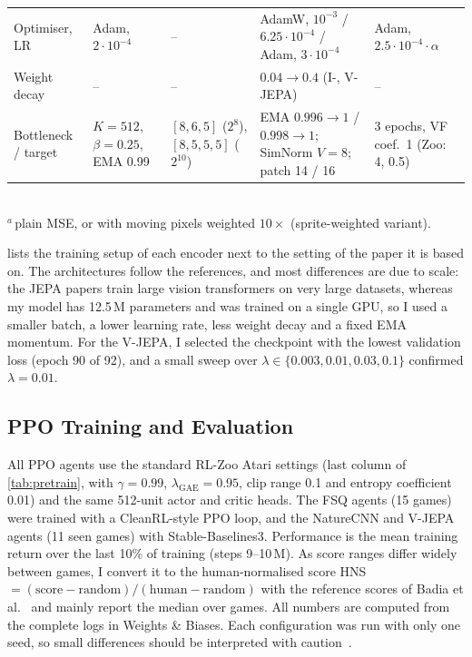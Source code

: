 \documentclass[runningheads]{llncs}
\begin{document}
\begin{table}[t]
\begin{tabular}{@{}Y{1.6cm}Y{2.25cm}Y{2.2cm}Y{2.95cm}Y{2.25cm}@{}}
Optimiser, LR & Adam, $2{\cdot}10^{-4}$ & -- & AdamW, $10^{-3}$ / $6.25{\cdot}10^{-4}$ / Adam, $3{\cdot}10^{-4}$ &
  Adam, $2.5{\cdot}10^{-4}\cdot\alpha$ \\
Weight decay & -- & -- & $0.04\to0.4$ (I-, V-JEPA) & -- \\
Bottleneck / target & $K{=}512$, $\beta{=}0.25$, EMA 0.99 & $[8,6,5]$ ($2^8$), $[8,5,5,5]$ ($2^{10}$) &
  EMA $0.996\to1$ / $0.998\to1$; SimNorm $V{=}8$; patch 14 / 16 & 3 epochs, VF coef.\ 1 (Zoo: 4, 0.5) \\
\bottomrule
\end{tabular}\\[2pt]
{\scriptsize $^{a}$\,plain MSE, or with moving pixels weighted $10\times$ (sprite-weighted variant).}
\end{table}

 lists the training setup of each encoder next to the setting of the paper
it is based on. The architectures follow the references, and most differences are due to scale: the JEPA
papers train large vision transformers on very large datasets, whereas my model has
12.5\,M parameters and was trained on a single GPU, so I used a smaller batch, a lower learning
rate, less weight decay and a fixed EMA momentum. For the V-JEPA, I selected
the checkpoint with the lowest validation loss (epoch 90 of 92), and a small sweep over
$\lambda\in\{0.003,0.01,0.03,0.1\}$ confirmed $\lambda=0.01$.

\subsection{PPO Training and Evaluation}

All PPO agents use the standard RL-Zoo Atari settings (last column of \cref{tab:pretrain},
with $\gamma=0.99$, $\lambda_{\text{GAE}}=0.95$, clip range 0.1 and entropy coefficient 0.01)
and the same 512-unit actor and critic heads. The FSQ agents (15 games) were trained with a
CleanRL-style PPO loop, and the NatureCNN and V-JEPA agents (11 seen games) with
Stable-Baselines3. Performance is the mean training return over the last 10\% of training (steps 9--10\,M). As
score ranges differ widely between games, I convert it to the human-normalised score
HNS$=(\text{score}-\text{random})/(\text{human}-\text{random})$ with the reference scores of
Badia et al.~\cite{badia2020agent57} and mainly report the median over games. All numbers are
computed from the complete logs in Weights \& Biases. Each configuration was run with only one
seed, so small differences should be interpreted with caution~\cite{agarwal2021precipice}.
\end{document}
